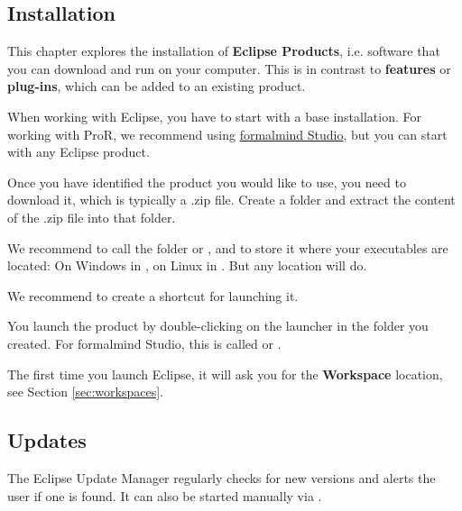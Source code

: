 \subsection{Installation}
\label{sec:installation}

This chapter explores the installation of \textbf{Eclipse Products}, i.e. software that you can download and run on your computer.  This is in contrast to \textbf{features} or \textbf{plug-ins}, which can be added to an existing product.

When working with Eclipse, you have to start with a base installation.  For working with ProR, we recommend using \href{http://formalmind.com/studio}{formalmind Studio}, but you can start with any Eclipse product.

Once you have identified the product you would like to use, you need to download it, which is typically a .zip file.  Create a folder and extract the content of the .zip file into that folder.

\begin{info}
We recommend to call the folder  or , and to store it where your executables are located: On Windows in , on Linux in .  But any location will do.

We recommend to create a shortcut for launching it.
\end{info}

You launch the product by double-clicking on the launcher in the folder you created.  For formalmind Studio, this is called  or .

The first time you launch Eclipse, it will ask you for the \textbf{Workspace} location, see Section \ref{sec:workspaces}.

\subsection{Updates}
\label{sec:update}

The Eclipse Update Manager regularly checks for new versions and alerts the user if one is found.  It can also be started manually via .

